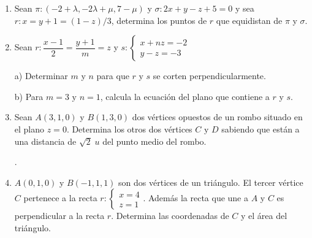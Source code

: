 \begin{enumerate}
\vspace{2mm} 

\item Sean $\pi: (-2+\lambda,-2\lambda+\mu,7-\mu)$ y $\sigma: 2x+y-z+5=0$ y sea $r:x=y+1=(1-z)/3$, determina los puntos de $r$ que equidistan de $\pi$ y $\sigma$.

\vspace{2mm} 

\item Sean $r:\dfrac {x-1}2=\dfrac{y+1}m=z$ y $s:\begin{cases}x+nz=-2\\y-z=-3\end{cases}$

a) Determinar $m$ y $n$ para que $r$ y $s$ se corten perpendicularmente.

b) Para $m=3 \text{ y } n=1$, calcula la ecuación del plano que contiene a $r$ y $s$. 

\vspace{2mm} 

\item Sean $A(3,1,0)$ y $B(1,3,0)$ dos vértices opuestos de un rombo situado en el plano $z=0$. Determina los otros dos vértices $C \text{ y } D$ sabiendo que están a una distancia de $\sqrt{2}\; u$ del punto medio del rombo.

.

\vspace{2mm} 

\item  $A(0,1,0)$ y $B(-1,1,1)$ son dos vértices de un triángulo. El tercer vértice $C$ pertenece a la recta $r:\begin{cases}x=4\\z=1\end{cases}$. Además la recta que une a $A$ y $C$ es perpendicular a la recta $r$. Determina las coordenadas de $C$ y el área del triángulo.

\vspace{2mm} 


\end{enumerate}
